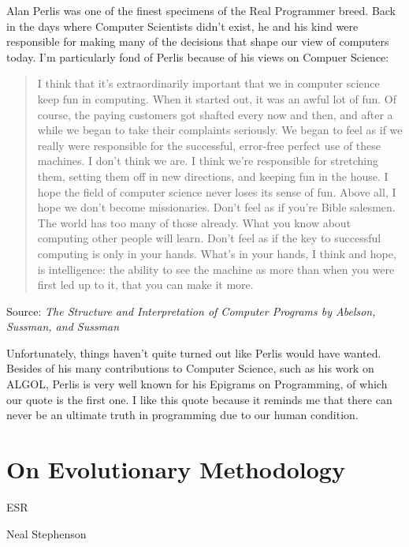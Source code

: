 \documentclass{memoir}
\begin{document}
Alan Perlis was one of the finest specimens of the Real Programmer
breed. Back in the days where Computer Scientists didn't exist, he and
his kind were responsible for making many of the decisions that shape
our view of computers today. I'm particularly fond of Perlis because
of his views on Compuer Science:

\begin{quote}
I think that it's extraordinarily important that we in computer
science keep fun in computing. When it started out, it was an awful
lot of fun. Of course, the paying customers got shafted every now and
then, and after a while we began to take their complaints
seriously. We began to feel as if we really were responsible for the
successful, error-free perfect use of these machines. I don't think we
are. I think we're responsible for stretching them, setting them off
in new directions, and keeping fun in the house. I hope the field of
computer science never loses its sense of fun. Above all, I hope we
don't become missionaries. Don't feel as if you're Bible salesmen. The
world has too many of those already. What you know about computing
other people will learn. Don't feel as if the key to successful
computing is only in your hands. What's in your hands, I think and
hope, is intelligence: the ability to see the machine as more than
when you were first led up to it, that you can make it more.
\end{quote}

\begin{flushright}
  Source: \emph{The Structure and Interpretation of Computer
    Programs by Abelson, Sussman, and Sussman}
\end{flushright}

Unfortunately, things haven't quite turned out like Perlis would have
wanted. Besides of his many contributions to Computer Science, such as
his work on ALGOL, Perlis is very well known for his Epigrams on
Programming, of which our quote is the first one. I like this quote
because it reminds me that there can never be an ultimate truth in
programming due to our human condition.

\chapter{On Evolutionary Methodology}

\begin{epigraphs}
      {ESR}
\end{epigraphs}
\begin{epigraphs}
      {Neal Stephenson}
\end{epigraphs}
\end{document}
